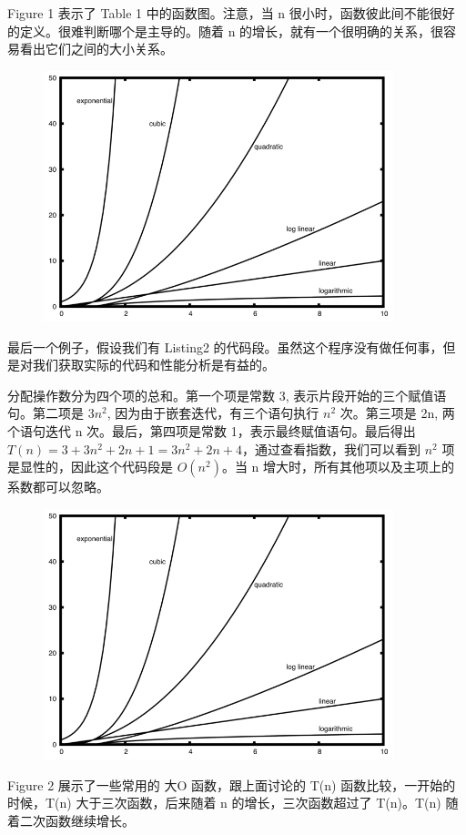 Figure 1 表示了 Table 1 中的函数图。注意，当 n 很小时，函数彼此间不能很好的定义。很难判断哪个是主导的。随着 n 的增长，就有一个很明确的关系，很容易看出它们之间的大小关系。


\begin{figure}[htbp]
        \centering
        \includegraphics[width=4in]{images/newplot.png}
\end{figure}

最后一个例子，假设我们有 Listing2 的代码段。虽然这个程序没有做任何事，但是对我们获取实际的代码和性能分析是有益的。


分配操作数分为四个项的总和。第一个项是常数 3, 表示片段开始的三个赋值语句。第二项是 $3n^2$, 因为由于嵌套迭代，有三个语句执行 $n^2$ 次。第三项是 2n, 两个语句迭代 n 次。最后，第四项是常数 1，表示最终赋值语句。最后得出 $T(n)=3+3n^2 +2n+1=3n^2 + 2n+4$，通过查看指数，我们可以看到 $n^2$ 项是显性的，因此这个代码段是 $O(n^ 2 )$。当 n 增大时，所有其他项以及主项上的系数都可以忽略。
\begin{figure}[htbp]
        \centering
        \includegraphics[width=4in]{images/newplot.png}
\end{figure}
Figure 2 展示了一些常用的 大O 函数，跟上面讨论的 T(n) 函数比较，一开始的时候，T(n) 大于三次函数，后来随着 n 的增长，三次函数超过了 T(n)。T(n) 随着二次函数继续增长。

